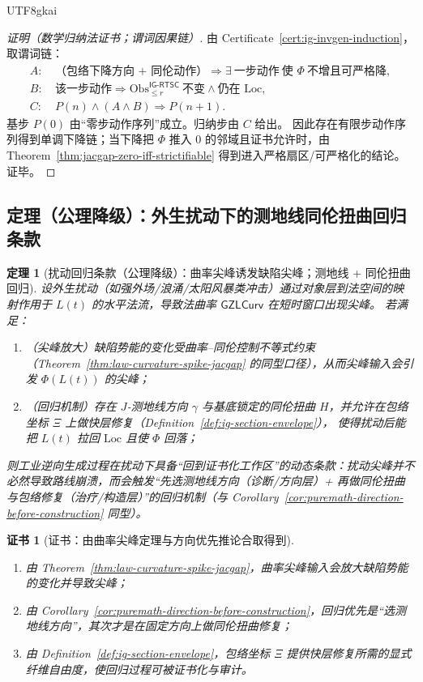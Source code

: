 \documentclass[12pt]{article}
\newtheorem{theorem}{定理}[section]
\newtheorem{certificate}{证书}[section]
\newcommand{\GZLCurv}{\ensuremath{\mathsf{GZLCurv}}}
\begin{document}
\begin{CJK*}{UTF8}{gkai}
\begin{proof}[证明（数学归纳法证书；谓词因果链）]
由 Certificate~\ref{cert:ig-invgen-induction}，取谓词链：
\[
\begin{aligned}
A:&\ \text{（包络下降方向 + 同伦动作）}\Rightarrow \exists\ \text{一步动作}\ \text{使 }\Phi\ \text{不增且可严格降},\\
B:&\ \text{该一步动作}\Rightarrow \mathrm{Obs}_{\le r}^{\textsf{IG-RTSC}}\ \text{不变}\wedge \text{仍在 }\mathrm{Loc},\\
C:&\ P(n)\wedge (A\wedge B)\Rightarrow P(n+1).
\end{aligned}
\]
基步 $P(0)$ 由“零步动作序列”成立。归纳步由 $C$ 给出。
因此存在有限步动作序列得到单调下降链；当下降把 $\Phi$ 推入 0 的邻域且证书允许时，由 Theorem~\ref{thm:jacgap-zero-iff-strictifiable} 得到进入严格扇区/可严格化的结论。证毕。
\end{proof}

\subsection{定理（公理降级）：外生扰动下的测地线同伦扭曲回归条款}

\begin{theorem}[扰动回归条款（公理降级）：曲率尖峰诱发缺陷尖峰；测地线 + 同伦扭曲回归]
\label{thm:ig-disturbance-regression}
设外生扰动（如强外场/浪涌/太阳风暴类冲击）通过对象层到法空间的映射作用于 $L(t)$ 的水平法流，导致法曲率 $\GZLCurv$ 在短时窗口出现尖峰。
若满足：
\begin{enumerate}
  \item（尖峰放大）缺陷势能的变化受曲率–同伦控制不等式约束（Theorem~\ref{thm:law-curvature-spike-jacgap} 的同型口径），从而尖峰输入会引发 $\Phi(L(t))$ 的尖峰；
  \item（回归机制）存在 $J$‑测地线方向 $\gamma$ 与基底锁定的同伦扭曲 $H$，并允许在包络坐标 $\Xi$ 上做快层修复（Definition~\ref{def:ig-section-envelope}），
    使得扰动后能把 $L(t)$ 拉回 $\mathrm{Loc}$ 且使 $\Phi$ 回落；
\end{enumerate}
则工业逆向生成过程在扰动下具备“回到证书化工作区”的动态条款：扰动尖峰并不必然导致路线崩溃，而会触发“先选测地线方向（诊断/方向层）+ 再做同伦扭曲与包络修复（治疗/构造层）”的回归机制（与 Corollary~\ref{cor:puremath-direction-before-construction} 同型）。
\end{theorem}

\begin{certificate}[证书：由曲率尖峰定理与方向优先推论合取得到]
\label{cert:ig-disturbance-regression}
\begin{enumerate}
  \item 由 Theorem~\ref{thm:law-curvature-spike-jacgap}，曲率尖峰输入会放大缺陷势能的变化并导致尖峰；
  \item 由 Corollary~\ref{cor:puremath-direction-before-construction}，回归优先是“选测地线方向”，其次才是在固定方向上做同伦扭曲修复；
  \item 由 Definition~\ref{def:ig-section-envelope}，包络坐标 $\Xi$ 提供快层修复所需的显式纤维自由度，使回归过程可被证书化与审计。
\end{enumerate}
\end{certificate}


\end{CJK*}
\end{document}
